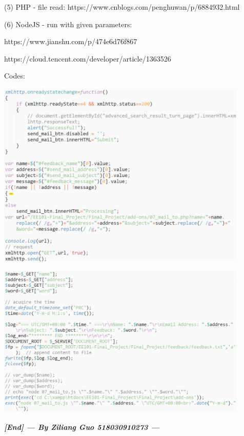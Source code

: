 \documentclass[10pt,twoside,a4paper,titlepage]{article}
\begin{document}
		\indent\indent(5) PHP - file read: https://www.cnblogs.com/penghuwan/p/6884932.html\par
		\indent\indent(6) NodeJS - run with given parameters:\par
			\indent\indent\indent https://www.jianshu.com/p/474e6d76f867\par
			\indent\indent\indent https://cloud.tencent.com/developer/article/1363526\newline\par
		\newpage
		Codes:\newline\par
		\includegraphics[width=0.9\textwidth]{gzl/12.jpg}\newline\par
		\includegraphics[width=0.9\textwidth]{gzl/13.jpg}\newline\par

	\textbf{\emph{[End] --- By Ziliang Guo 518030910273 ---}}
\end{document}
